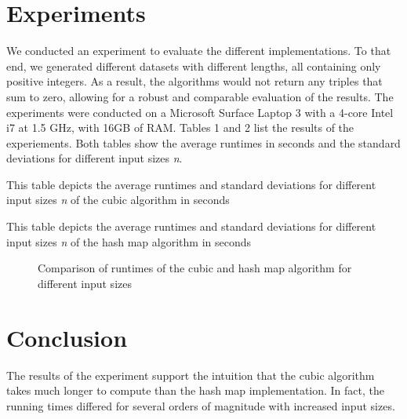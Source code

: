 \documentclass[12pt, a4paper]{article}
\begin{document}
\section{Experiments}

We conducted an experiment to evaluate the different implementations. To that end, we generated different datasets with different lengths, all containing only positive integers. As a result, the algorithms would not return any triples that sum to zero, allowing for a robust and comparable evaluation of the results. \newline
The experiments were conducted on a Microsoft Surface Laptop 3 with a 4-core Intel i7 at 1.5 GHz, with 16GB of RAM. \newline
Tables 1 and 2 list the results of the experiements. Both tables show the average runtimes in seconds and the standard deviations for different input sizes \emph{n}.

\begin{table}[h]
  \begin{center}
  \caption{This table depicts the average runtimes and standard deviations for different input sizes \emph{n} of the cubic algorithm in seconds}
  \label{tbl:resultscubic}
  \end{center}
\end{table}

\begin{table}[h]
  \begin{center}
  \caption{This table depicts the average runtimes and standard deviations for different input sizes \emph{n} of the hash map algorithm in seconds}
  \label{tbl:resultshashmap}
  \end{center}
\end{table}

\begin{figure}[h]
  \begin{center}
    \caption{Comparison of runtimes of the cubic and hash map algorithm for different input sizes}
    \label{fig:runtimes}
  \end{center}
\end{figure}

\clearpage

\section{Conclusion}
The results of the experiment support the intuition that the cubic algorithm takes much longer to compute than the hash map implementation. In fact, the running times differed for several orders of magnitude with increased input sizes.
\end{document}

